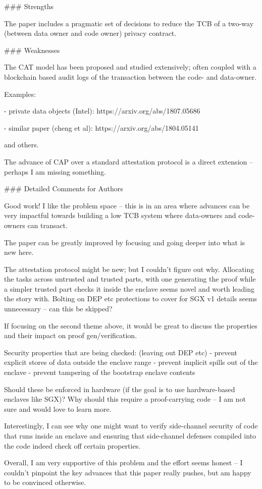 \begin{markdown}
### Strengths

The paper includes a pragmatic set of decisions to reduce the TCB
of a two-way (between data owner and code owner) privacy contract.

### Weaknesses

The CAT model has been proposed and studied extensively; often coupled
with a blockchain based audit logs of the transaction between the code-
and data-owner.

Examples: 

- private data objects (Intel): https://arxiv.org/abs/1807.05686

- similar paper (cheng et al): https://arxiv.org/abs/1804.05141

and others.

The advance of CAP over a standard attestation protocol is a direct
extension -- perhaps I am missing something.

### Detailed Comments for Authors

Good work! I like the problem space -- this is in an area where advances can be very impactful towards building a low TCB system where data-owners and code-owners can transact.

The paper can be greatly improved by focusing and going deeper into what is new here.

The attestation protocol might be new; but I couldn't figure out why. 
Allocating the tasks across untrusted and trusted parts, with one generating the proof while a simpler trusted part checks it inside the enclave seems novel and worth leading the story with. Bolting on DEP etc protections to cover for SGX v1 details seems unnecessary -- can this be skipped?

If focusing on the second theme above, it would be great to discuss the
properties and their impact on proof gen/verification.

Security properties that are being checked: (leaving out DEP etc)
- prevent explicit stores of data outside the enclave range
- prevent implicit spills out of the enclave
- prevent tampering of the bootstrap enclave contents

Should these be enforced in hardware (if the goal is to use hardware-based enclaves like SGX)? Why should this require a proof-carrying code -- I am not sure and would love to learn more.

Interestingly, I can see why one might want to verify side-channel security of code that runs inside an enclave and ensuring that side-channel defenses compiled into the code indeed check off certain properties.

Overall, I am very supportive of this problem and the effort seems honest -- I couldn't pinpoint the key advances that this paper really pushes, but am happy to be convinced otherwise.

\end{markdown}





